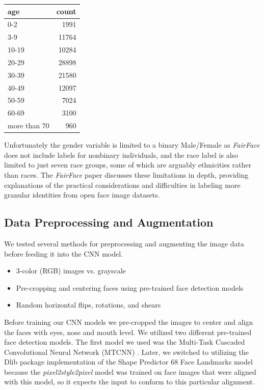 \documentclass[11pt, letterpaper]{article}
\newenvironment{Figure}
  {\par\medskip\noindent\minipage{\linewidth}}
  {\endminipage\par\medskip}
\providecommand{\tightlist}{%
  \setlength{\itemsep}{0pt}\setlength{\parskip}{0pt}
}
\begin{document}
\begin{multicols}{2}
  \begin{Figure}
    \label{ages}
  \begin{tabular}{lr}
    \toprule
        age          &  count \\
        \midrule
        0-2          &   1991 \\
        3-9          &  11764 \\
        10-19        &  10284 \\
        20-29        &  28898 \\
        30-39        &  21580 \\
        40-49        &  12097 \\
        50-59        &   7024 \\
        60-69        &   3100 \\
        more than 70 &    960 \\
        \bottomrule
  \end{tabular}
  \end{Figure}

  Unfortunately the gender variable is limited to a binary Male/Female
  as \emph{FairFace} does not include labels for nonbinary
  individuals, and the race label is also limited to just seven race
  groups, some of which are arguably ethnicities rather than races.
  The \emph{FairFace} paper\cite{karkkainen2019fairface} discusses
  these limitations in depth, providing explanations of the practical
  considerations and difficulties in labeling more granular identities
  from open face image datasets.

  \subsection{Data Preprocessing and Augmentation}

  We tested several methods for preprocessing and augmenting the image data
  before feeding it into the CNN model.

  \begin{itemize}
    \tightlist
  \item 3-color (RGB) images vs. grayscale
  \item Pre-cropping and centering faces using pre-trained face
    detection models
  \item Random horizontal flips, rotations, and shears
  \end{itemize}

  Before training our CNN models we pre-cropped the images to center
  and align the faces with eyes, nose and mouth level. We utilized two
  different pre-trained face detection models. The first model we used
  was the Multi-Task Cascaded Convolutional Neural Network (MTCNN)
  \cite{Zhang_2016}. Later, we switched to utilizing the Dlib package
  implementation of the Shape Predictor 68 Face Landmarks model
  \cite{SAGONAS20163} because the \emph{pixel2style2pixel} model was
  trained on face images that were aligned with this model, so it
  expects the input to conform to this particular alignment.


\end{multicols}
\end{document}
